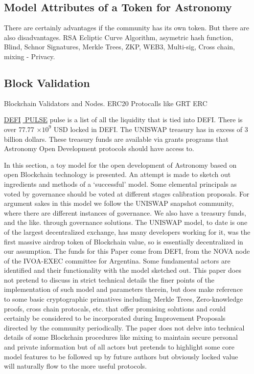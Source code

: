 \documentclass[final,5p,times,twocolumn,authoryear]{elsarticle}
\begin{document}
\subsection{Model Attributes of a Token for Astronomy}
\label{subsec:btc4}
There are certainly advantages if the community has its own token. But there are also disadvantages. RSA Ecliptic Curve Algorithm, asymetric hash function, Blind, Schnor Signatures, Merkle Trees, ZKP,  WEB3, Multi-sig, Cross chain, mixing - Privacy. 

\subsection{Block Validation}
\label{subsec: validator}
Blockchain Validators and Nodes. ERC20 Protocalls like GRT ERC   

\href{https://defipulse.com/}{DEFI$\;$ PULSE} pulse is a list of all the liquidity that is tied into DEFI. There is over 77.77 $\times 10^{9}$ USD locked in DEFI. The UNISWAP treasury has in excess of 3 billion dollars. These treasury funds are available via grants programs that Astronomy Open Development protocols should have access to.

In this section, a toy model for the open development of Astronomy based on open Blockchain technology is presented. An attempt is made to sketch out ingredients and methods of a `successful' model. Some elemental principals as voted by governance should be voted at different stages calibration proposals. For argument sakes in this model we follow the UNISWAP snapshot community, where there are different instances of governance. We also have a treasury funds, and the like.  through governance solutions. The UNISWAP model, to date is one of the largest decentralized exchange, has many developers working for it, was the first massive airdrop token of Blockchain value, so is essentially decentralized in our assumption. The funds for this Paper come from DEFI, from the NOVA node of the IVOA-EXEC committee for Argentina. Some fundamental actors are identified and their functionality with the model sketched out. This paper does not pretend to discuss in strict technical details the finer points of the implementation of such model and parameters therein, but does make reference to some basic cryptographic primatives including Merkle Trees, Zero-knowledge proofs, cross chain protocals, etc. that offer promising solutions and could certainly be considered to be incorporated during Improvement Proposals directed by the community periodically. The paper does not delve into technical details of some Blockchain procedures like mixing to maintain secure personal and private information but of all actors but pretends to highlight some core model features to be followed up by future authors but obviously  locked value will naturally flow to the more useful protocols.  
 
\end{document}
